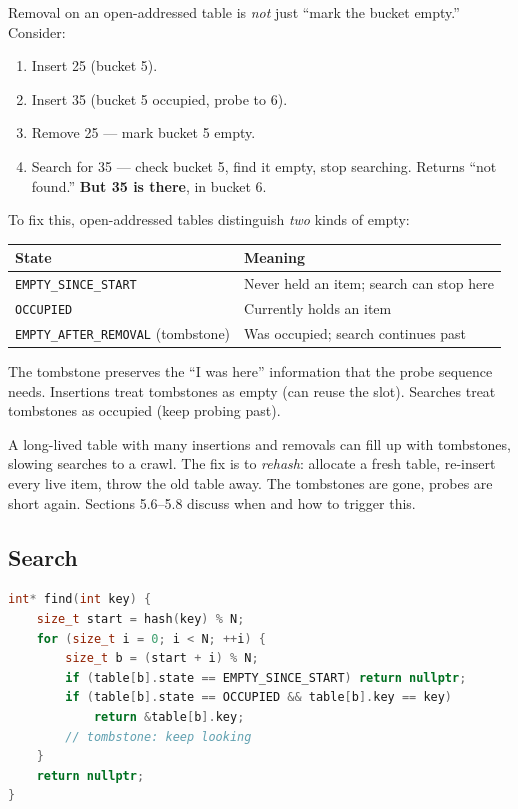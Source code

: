 \documentclass[11pt]{article}
\begin{document}
Removal on an open-addressed table is \emph{not} just ``mark the
bucket empty.'' Consider:

\begin{enumerate}[leftmargin=*]
    \item Insert 25 (bucket 5).
    \item Insert 35 (bucket 5 occupied, probe to 6).
    \item Remove 25 --- mark bucket 5 empty.
    \item Search for 35 --- check bucket 5, find it empty, stop
          searching. Returns ``not found.'' \textbf{But 35 is
          there}, in bucket 6.
\end{enumerate}

To fix this, open-addressed tables distinguish \emph{two} kinds
of empty:

\begin{center}
\begin{tabular}{|l|l|}
\hline
\textbf{State} & \textbf{Meaning} \\
\hline
\texttt{EMPTY\_SINCE\_START} & Never held an item; search can stop here \\
\texttt{OCCUPIED}            & Currently holds an item \\
\texttt{EMPTY\_AFTER\_REMOVAL} (tombstone) & Was occupied; search continues past \\
\hline
\end{tabular}
\end{center}

The tombstone preserves the ``I was here'' information that the
probe sequence needs. Insertions treat tombstones as empty (can
reuse the slot). Searches treat tombstones as occupied (keep
probing past).

\begin{warnbox}
A long-lived table with many insertions and removals can fill up
with tombstones, slowing searches to a crawl. The fix is to
\emph{rehash}: allocate a fresh table, re-insert every live item,
throw the old table away. The tombstones are gone, probes are
short again. Sections 5.6--5.8 discuss when and how to trigger
this.
\end{warnbox}

\subsection*{Search}

\begin{examplebox}
\begin{lstlisting}[language=C++,basicstyle=\ttfamily\small,frame=single]
int* find(int key) {
    size_t start = hash(key) % N;
    for (size_t i = 0; i < N; ++i) {
        size_t b = (start + i) % N;
        if (table[b].state == EMPTY_SINCE_START) return nullptr;
        if (table[b].state == OCCUPIED && table[b].key == key)
            return &table[b].key;
        // tombstone: keep looking
    }
    return nullptr;
}
\end{lstlisting}
\end{examplebox}
\end{document}
